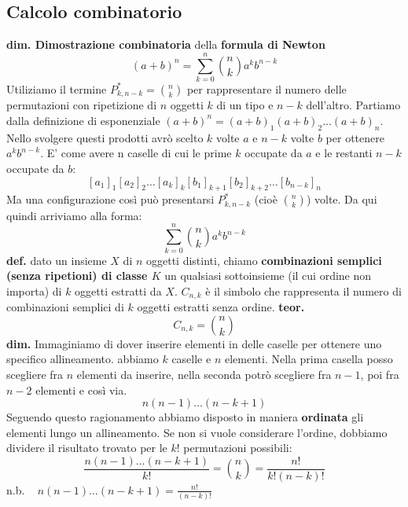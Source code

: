 \subsection*{Calcolo combinatorio}
\textbf{dim. Dimostrazione combinatoria} della \textbf{formula di Newton}
\[
    (a+b)^n = \sum_{k=0}^n\binom{n}{k}a^kb^{n-k}
\]
Utiliziamo il termine $P^{*}_{k,n-k} = \binom{n}{k}$ per rappresentare il numero delle permutazioni con ripetizione di $n$ oggetti $k$ di un tipo e $n-k$ dell'altro.
\newline
Partiamo dalla definizione di esponenziale $(a+b)^n = (a+b)_1(a+b)_2\dots(a+b)_n$. Nello svolgere questi prodotti avrò scelto $k$ volte $a$ e $n-k$ volte $b$ per ottenere $a^kb^{n-k}$. E' come avere n caselle di cui le prime $k$ occupate da $a$ e le restanti $n-k$ occupate da $b$:
\[
    [a_1]_1[a_2]_2\dots[a_k]_k[b_1]_{k+1}[b_2]_{k+2}\dots[b_{n-k}]_n
\]
Ma una configurazione così può presentarsi $P^*_{k,n-k}$ (cioè $\binom{n}{k}$) volte.
\newline
Da qui quindi arriviamo alla forma:
\[
    \sum_{k=0}^n\binom{n}{k}a^kb^{n-k}
\]
\newline
\newline
\textbf{def.} dato un insieme $X$ di $n$ oggetti distinti, chiamo \textbf{combinazioni semplici (senza ripetioni) di classe $K$} un qualsiasi sottoinsieme (il cui ordine non importa) di $k$ oggetti estratti da $X$.\newline
\textbf{$C_{n,k}$} è il simbolo che rappresenta il numero di combinazioni semplici di $k$ oggetti estratti senza ordine.
\newline
\newline
\textbf{teor.}
\[
    C_{n,k} = \binom{n}{k}
\]
\textbf{dim.} Immaginiamo di dover inserire elementi in delle caselle per ottenere uno specifico allineamento. abbiamo $k$ caselle e $n$ elementi. Nella prima casella posso scegliere fra $n$ elementi da inserire, nella seconda potrò scegliere fra $n-1$, poi fra $n-2$ elementi e così via. 
\[
    n(n-1)\dots(n-k+1)
\] 
Seguendo questo ragionamento abbiamo disposto in maniera \textbf{ordinata} gli elementi lungo un allineamento. Se non si vuole considerare l'ordine, dobbiamo dividere il risultato trovato per le $k!$ permutazioni possibili:
\[
    \frac{n(n-1)\dots(n-k+1)}{k!} = \binom{n}{k} = \frac{n!}{k!(n-k)!}
\] 
n.b. $\;\;\;n(n-1)\dots(n-k+1) = \frac{n!}{(n-k)!}$

